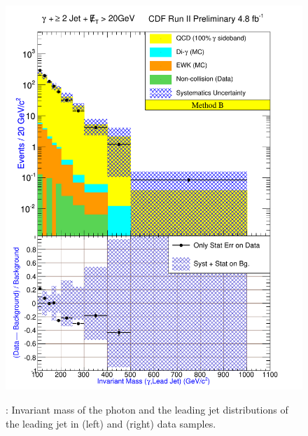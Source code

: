 \documentclass[11pt]{article}
\begin{document}
\begin{figure}[h!]
{ \includegraphics[scale=\resultsHistScale,keepaspectratio=true]{./g30jetmet20_MtdB_plot2_InvMass_pj1.pdf}
}
 \caption{: Invariant mass of the photon and the leading jet distributions of the leading jet in \phoonejetmettwenty (left) and \photwojetmettwenty (right) data samples.}
 \label{fig:Result_MtdB_gj1Met20_Mass_gj1}
\end{figure}
\end{document}
